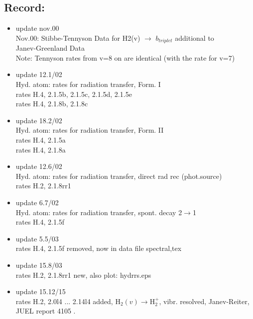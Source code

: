 \documentclass[12pt,dvipdfmx]{article}
\begin{document}
\subsection{Record:}\label{record}
\begin{itemize}
\item update  nov.00  \\
Nov.00: Stibbe-Tennyson Data for H2(v) $\rightarrow$ $b_{triplet}$ additional to\\
        Janev-Greenland Data       \\
        Note: Tennyson rates from v=8 on are identical (with the rate for v=7)
\item update  12.1/02 \\
   Hyd. atom: rates for radiation transfer, Form. I\\
     rates H.4, 2.1.5b, 2.1.5c, 2.1.5d, 2.1.5e \\
     rates H.4, 2.1.8b, 2.1.8c \\
\item update  18.2/02 \\
   Hyd. atom: rates for radiation transfer, Form. II \\
     rates H.4, 2.1.5a \\
     rates H.4, 2.1.8a \\
\item update  12.6/02 \\
   Hyd. atom: rates for radiation transfer, direct rad rec (phot.source) \\
     rates H.2, 2.1.8rr1\\
\item update   6.7/02 \\
   Hyd. atom: rates for radiation transfer, spont. decay 2$\rightarrow$1 \\
     rates H.4, 2.1.5f\\
\item update   5.5/03 \\
     rates H.4, 2.1.5f removed, now in data file spectral,tex\\
\item update  15.8/03 \\
     rates H.2, 2.1.8rr1 new, also plot: hydrrs.eps\\
\item update  15.12/15 \\
     rates H.2, 2.0l4 ... 2.14l4 added, H$_2(v) \rightarrow $H$_2^+$, vibr. resolved, Janev-Reiter,
     JUEL report 4105 \cite{kn:JRS}.

\end{itemize}
\end{document}
